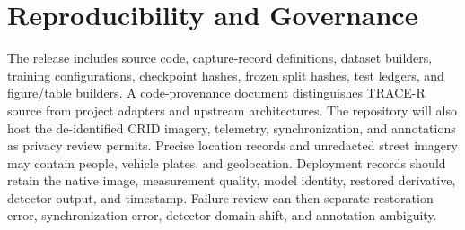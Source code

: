 \documentclass[journal]{IEEEtran}
\begin{document}
\section{Reproducibility and Governance}
\label{sup:reproducibility}
The release includes source code, capture-record definitions, dataset builders, training configurations, checkpoint hashes, frozen split hashes, test ledgers, and figure/table builders. A code-provenance document distinguishes TRACE-R source from project adapters and upstream architectures. The repository will also host the de-identified CRID imagery, telemetry, synchronization, and annotations as privacy review permits. Precise location records and unredacted street imagery may contain people, vehicle plates, and geolocation. Deployment records should retain the native image, measurement quality, model identity, restored derivative, detector output, and timestamp. Failure review can then separate restoration error, synchronization error, detector domain shift, and annotation ambiguity.
\end{document}
